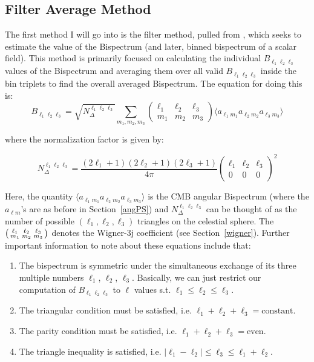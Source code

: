 \documentclass[11pt]{article}
\renewcommand{\_}[1]{\underline{ #1 }}
\providecommand{\abs}[1]{\lvert #1 \rvert}
\begin{document}
{\subsection{Filter Average Method}\label{averagemethod}

The first method I will go into is the filter method, pulled from \cite{Bucher_2016}, which seeks to estimate the value of the Bispectrum (and later, binned bispectrum of a scalar field). This method is primarily focused on calculating the individual $B_{\ell_1 \ell_2 \ell_3}$ values of the Bispectrum and averaging them over all valid $B_{\ell_1 \ell_2 \ell_3}$ inside the bin triplets to find the overall averaged Bispectrum. The equation for doing this is:
\begin{equation}
    B_{\ell_1\ell_2\ell_3} = \sqrt{N_{\Delta}^{\ell_1\ell_2\ell_3}} \sum_{m_1,m_2,m_3}
    \begin{pmatrix}
        \ell_1 & \ell_2 & \ell_3 \\
        m_1 & m_2 & m_3
    \end{pmatrix}
    \langle a_{\ell_1 m_1} a_{\ell_2 m_2} a_{\ell_3 m_3} \rangle
\end{equation}

where the normalization factor is given by:

\begin{equation}
N_{\Delta}^{\ell_1\ell_2\ell_3} = \frac{(2\ell_1+1)(2\ell_2+1)(2\ell_3+1)}{4\pi}
    \begin{pmatrix}
        \ell_1 & \ell_2 & \ell_3 \\
        0 & 0 & 0
    \end{pmatrix}^2
\end{equation}

Here, the quantity $\langle a_{\ell_1 m_1} a_{\ell_2 m_2} a_{\ell_3 m_3} \rangle$ is the CMB angular Bispectrum (where the $a_{\ell m}$'s are as before in Section~\ref{angPS}) and $N_{\Delta}^{\ell_1 \ell_2 \ell_3}$ can be thought of as the number of possible $(\ell_1, \ell_2, \ell_3)$ triangles on the celestial sphere. The $\begin{psmallmatrix}
    \ell_1 & \ell_2 & \ell_3 \\
    m_1 & m_2 & m_3
\end{psmallmatrix}$ denotes the Wigner-3j coefficient (see Section~\ref{wigner}). Further important information to note about these equations include that:
\begin{enumerate}
    \item The bispectrum is symmetric under the simultaneous exchange of its three multiple numbers $\ell_1$, $\ell_2$, $\ell_3$. Basically, we can just restrict our computation of $B_{\ell_1 \ell_2 \ell_3}$ to $\ell$ values s.t. $\ell_1 \leq \ell_2 \leq \ell_3$.
    \item The triangular condition must be satisfied, i.e. $\ell_1 + \ell_2 + \ell_3 = \text{constant}$.
    \item The parity condition must be satisfied, i.e. $\ell_1 + \ell_2 + \ell_3 = \text{even}$.
    \item The triangle inequality is satisfied, i.e. $\abs{\ell_1 - \ell_2} \leq \ell_3 \leq \ell_1 + \ell_2$.
\end{enumerate}

}
\end{document}
